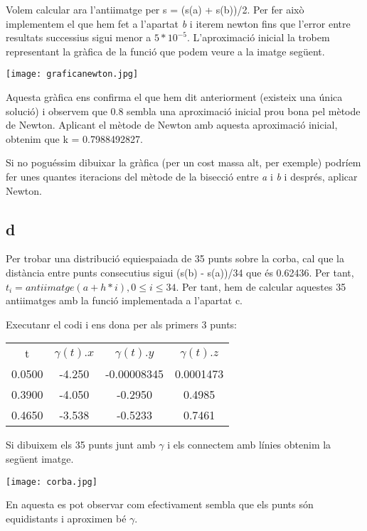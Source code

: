 \documentclass{article}
\begin{document}
Volem calcular ara l'antiimatge per s = (s(a) + s(b))/2. Per fer això implementem el que hem fet a l'apartat \emph{b} i iterem newton fins que l'error entre resultats successius sigui menor a $5*10^{-5}$.
L'aproximació inicial la trobem representant la gràfica de la funció que podem veure a la imatge següent.


\begin{center}
\texttt{[image: graficanewton.jpg]}
\end{center}

Aquesta gràfica ens confirma el que hem dit anteriorment (existeix una única solució) i observem que 0.8 sembla una aproximació inicial prou bona pel mètode de Newton. Aplicant el mètode de Newton amb aquesta aproximació inicial, obtenim que k = 0.7988492827.

Si no poguéssim dibuixar la gràfica (per un cost massa alt, per exemple) podríem fer unes quantes iteracions del mètode de la bisecció entre \emph{a} i \emph{b} i després, aplicar Newton.


\subsection{d}

Per trobar una distribució equiespaiada de 35 punts sobre la corba, cal que la distància entre punts consecutius sigui (s(b) - s(a))/34 que és 0.62436. Per tant, $t_{i} = antiimatge(a + h*i), 0 \leq i \leq 34 $. Per tant, hem de calcular aquestes 35 antiimatges amb la funció implementada a l'apartat c. 

Executanr el codi i ens dona per als primers 3 punts:

\begin{center}
\begin{tabular}{c c c c}
t & \(\gamma(t).x\) & \(\gamma(t).y\)  & \(\gamma(t).z\) \\
0.0500 & -4.250 & -0.00008345 & 0.0001473 \\
0.3900 & -4.050 & -0.2950 & 0.4985 \\
0.4650 & -3.538 & -0.5233 & 0.7461
\end{tabular}
\end{center}

Si dibuixem els 35 punts junt amb \(\gamma\) i els connectem amb línies obtenim la següent imatge.

\begin{center}
\texttt{[image: corba.jpg]}
\end{center}
 
 
En aquesta es pot observar com efectivament sembla que els punts són equidistants i aproximen bé \(\gamma \).
 
\end{document}
